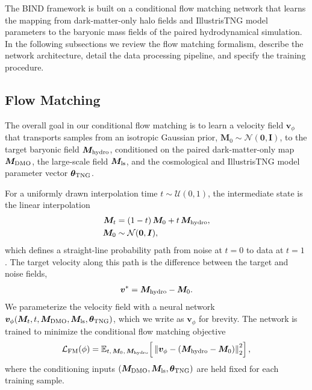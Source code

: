 \documentclass[linenumbers,trackchanges, twocolumn]{aastex701}
\begin{document}
The \textsc{BIND} framework is built on a conditional flow matching
network that learns the mapping from dark-matter-only halo fields and
IllustrisTNG model parameters to the baryonic mass fields of the paired
hydrodynamical simulation. In the following subsections we review the
flow matching formalism, describe the network architecture, detail the
data processing pipeline, and specify the training procedure.

\subsection{Flow Matching}
\label{subsec:fm}

The overall goal in our conditional flow matching is to learn a velocity
field $\bm{v}_{\phi}$ that transports samples from an isotropic Gaussian
prior, $\bm{M}_0 \sim \mathcal{N}(\bm{0},\bm{I})$, to the target baryonic
field $\bm{M}_{\rm hydro}$, conditioned on the paired dark-matter-only map
$\bm{M}_{\rm DMO}$, the large-scale field $\bm{M}_{\rm ls}$, and the
cosmological and IllustrisTNG model parameter vector
$\boldsymbol{\theta}_{\rm TNG}$.

For a uniformly drawn interpolation time $t \sim \mathcal{U}(0,1)$, the
intermediate state is the linear interpolation
\begin{equation}
\begin{split}
    \bm{M}_t &= (1-t)\,\bm{M}_0 + t\,\bm{M}_{\rm hydro}, \\
    \bm{M}_0 &\sim \mathcal{N}(\bm{0},\bm{I}),
\end{split}
    \label{eq:fm_path}
\end{equation}
which defines a straight-line probability path from noise at $t=0$ to
data at $t=1$ \citep{lipman2023flowmatching}. The target velocity along
this path is the difference between the target and noise fields,
\begin{equation}
    \bm{v}^{\ast} = \bm{M}_{\rm hydro} - \bm{M}_0.
    \label{eq:fm_target}
\end{equation}
We parameterize the velocity field with a neural network
$\bm{v}_{\phi}(\bm{M}_t, t, \bm{M}_{\rm DMO}, \bm{M}_{\rm ls},
\boldsymbol{\theta}_{\rm TNG})$, which we write as $\bm{v}_{\phi}$ for
brevity. The network is trained to minimize the conditional flow matching
objective
\begin{equation}
    \mathcal{L}_{\rm FM}(\phi)
    =
    \mathbb{E}_{t,\,\bm{M}_0,\,\bm{M}_{\rm hydro}}
    \!\left[\,
    \left\|
        \bm{v}_{\phi}
        -
        \left(\bm{M}_{\rm hydro} - \bm{M}_0\right)
    \right\|_2^2
    \right],
    \label{eq:fm_loss}
\end{equation}
where the conditioning inputs $(\bm{M}_{\rm DMO}, \bm{M}_{\rm ls},
\boldsymbol{\theta}_{\rm TNG})$ are held fixed for each training sample.
\end{document}
